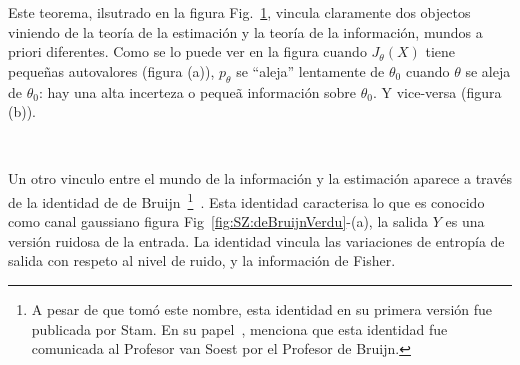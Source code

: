 %
Este  teorema,  ilsutrado  en  la figura  Fig.~\ref{fig:SZ:JCurvatura},  vincula
claramente dos objectos viniendo de la teor\'ia de la estimaci\'on y la teor\'ia
de la  informaci\'on, mundos a  priori diferentes.  Como  se lo puede ver  en la
figura   cuando  $J_\theta(X)$  tiene   peque\~nas  autovalores   (figura  (a)),
$p_\theta$ se  ``aleja'' lentamente  de $\theta_0$ cuando  $\theta$ se  aleja de
$\theta_0$: hay una alta incerteza  o peque\~a informaci\'on sobre $\theta_0$. Y
vice-versa (figura (b)).
%
\begin{figure}[h!]
%
\begin{center}  \end{center}
%
%
\label{fig:SZ:JCurvatura}
\end{figure}

\

Un otro vinculo  entre el mundo de la informaci\'on y  la estimaci\'on aparece a
trav\'es  de la  identidad de  de Bruijn~\footnote{A  pesar de  que  tom\'o este
  nombre, esta identidad  en su primera versi\'on fue publicada  por Stam. En su
  papel~\cite{Sta59}, menciona que esta identidad fue comunicada al Profesor van
  Soest por el Profesor  de Bruijn.}~\cite{Sta59, CovTho06, Joh04, Bar84, Bar86,
  PalVer06}. Esta identidad caracterisa lo  que es conocido como canal gaussiano
figura Fig~\ref{fig:SZ:deBruijnVerdu}-(a),  \ie la  salida $Y$ es  una versi\'on
ruidosa de  la entrada.  La identidad vincula  las variaciones de  entrop\'ia de
salida con respeto al nivel de ruido, y la informaci\'on de Fisher.


